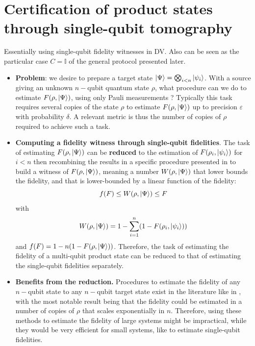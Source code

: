 \documentclass[a4paper,unpublished,onecolumn,11pt]{quantumarticle}
\begin{document}
\newpage
\section{Certification of product states through single-qubit tomography}
Essentially using single-qubit fidelity witnesses in DV. Also can be seen as the particular case $C=\mathbb I$ of the general protocol presented later.
\begin{itemize}
    \item \textbf{Problem}: we desire to prepare a target state $\ket\Psi = \bigotimes_{i<n}\ket{\psi_i}$. With a source giving an unknown $n-$qubit quantum state $\rho$, what procedure can we do to estimate $F(\rho, \ket \Psi)$, using only Pauli measurements ? Typically this task requires several copies of the state $\rho$ to estimate $F(\rho, \ket \Psi)$ up to precision $\varepsilon$ with probability $\delta$. A relevant metric is thus the number of copies of $\rho$ required to achieve such a task. 
    \item \textbf{Computing a fidelity witness through single-qubit fidelities}. The task of estimating $F(\rho, \ket\Psi)$ can be \textbf{reduced} to the estimation of $F(\rho_i, \ket{\psi_i})$ for $i<n$ then recombining the results in a specific procedure presented in \cite{CGKM21:efficient} to build a witness of $F(\rho, \ket\Psi)$, meaning a number $W(\rho, \ket\Psi)$ that lower bounds the fidelity, and that is lower-bounded by a linear function of the fidelity:
    \begin{equation}
        f(F) \leq W(\rho, \ket \Psi) \leq F
    \end{equation}
    with
    \begin{equation}
        W(\rho, \ket\Psi) = 1- \sum_{i=1}^n (1-F(\rho_i, \ket{\psi_i}))
    \end{equation}
    and $f(F) = 1-n(1-F(\rho, \ket\Psi))$. Therefore, the task of estimating the fidelity of a multi-qubit product state can be reduced to that of estimating the single-qubit fidelities separately.
    \item \textbf{Benefits from the reduction.}   
    Procedures to estimate the fidelity of any $n-$qubit state to any $n-$qubit target state exist in the literature like in \cite{FL11:direct, FOS24:optimal}, with the most notable result being that the fidelity could be estimated in a number of copies of $\rho$ that scales exponentially in $n$. Therefore, using these methods to estimate the fidelity of large systems might be impractical, while they would be very efficient for small systems, like to estimate single-qubit fidelities.
    
\end{itemize}
\end{document}
